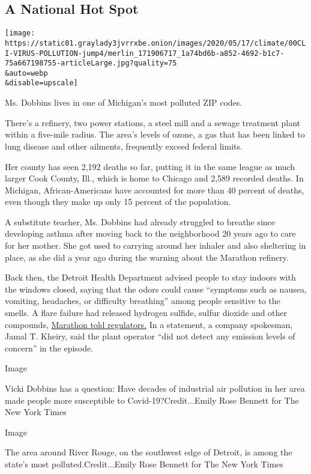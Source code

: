 \hypertarget{a-national-hot-spot}{%
\subsection{A National Hot Spot}\label{a-national-hot-spot}}

\texttt{[image: https://static01.graylady3jvrrxbe.onion/images/2020/05/17/climate/00CLI-VIRUS-POLLUTION-jump4/merlin\_171906717\_1a74bd6b-a852-4692-b1c7-75a667198755-articleLarge.jpg?quality=75\\\&auto=webp\\\&disable=upscale]}

Ms. Dobbins lives in one of Michigan's most polluted ZIP codes.

There's a refinery, two power stations, a steel mill and a sewage
treatment plant within a five-mile radius. The area's levels of ozone, a
gas that has been linked to lung disease and other ailments, frequently
exceed federal limits.

Her county has seen 2,192 deaths so far, putting it in the same league
as much larger Cook County, Ill., which is home to Chicago and 2,589
recorded deaths. In Michigan, African-Americans have accounted for more
than 40 percent of deaths, even though they make up only 15 percent of
the population.

A substitute teacher, Ms. Dobbins had already struggled to breathe since
developing asthma after moving back to the neighborhood 20 years ago to
care for her mother. She got used to carrying around her inhaler and
also sheltering in place, as she did a year ago during the warning about
the Marathon refinery.

Back then, the Detroit Health Department advised people to stay indoors
with the windows closed, saying that the odors could cause ``symptoms
such as nausea, vomiting, headaches, or difficulty breathing'' among
people sensitive to the smells. A flare failure had released hydrogen
sulfide, sulfur dioxide and other compounds,
\href{https://www.michigan.gov/mienvironment/0,9349,7-385-90161-504479--,00.html}{Marathon
told regulators.} In a statement, a company spokesman, Jamal T. Kheiry,
said the plant operator ``did not detect any emission levels of
concern'' in the episode.

Image

Vicki Dobbins has a question: Have decades of industrial air pollution
in her area made people more susceptible to Covid-19?Credit...Emily Rose
Bennett for The New York Times

Image

The area around River Rouge, on the southwest edge of Detroit, is among
the state's most polluted.Credit...Emily Rose Bennett for The New York
Times

